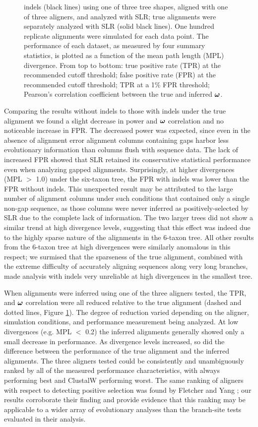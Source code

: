 \documentclass{article}
\begin{document}
\begin{figure}[t]
{  indels (black lines) using one of three tree shapes, aligned with
  one of three aligners, and analyzed with SLR; true alignments were
  separately analyzed with SLR (solid black lines). One hundred
  replicate alignments were simulated for each data point. The
  performance of each dataset, as measured by four summary statistics,
  is plotted as a function of the mean path length (MPL)
  divergence. From top to bottom: true positive rate (TPR) at the
  recommended cutoff threshold; false positive rate (FPR) at the
  recommended cutoff threshold; TPR at a 1\% FPR threshold; Pearson's
  correlation coefficient between the true and inferred $\bm{\omega}$.}
\label{fig_3}
\end{figure}

Comparing the results without indels to those with indels under the
true alignment we found a slight decrease in power and $\bm{\omega}$
correlation and no noticeable increase in FPR. The decreased power was
expected, since even in the absence of alignment error alignment
columns containing gaps harbor less evolutionary information than
columns flush with sequence data. The lack of increased FPR showed
that SLR retained its conservative statistical performance even when
analyzing gapped alignments. Surprisingly, at higher divergences (MPL
$>$ 1.0) under the six-taxon tree, the FPR with indels was lower than
the FPR without indels. This unexpected result may be attributed to
the large number of alignment columns under such conditions that
contained only a single non-gap sequence, as those columns were never
inferred as positively-selected by SLR due to the complete lack of
information. The two larger trees did not show a similar trend at high
divergence levels, suggesting that this effect was indeed due to the
highly sparse nature of the alignments in the 6-taxon tree. All other
results from the 6-taxon tree at high divergences were similarly
anomalous in this respect; we surmised that the sparseness of the true
alignment, combined with the extreme difficulty of accurately aligning
sequences along very long branches, made \sw analysis with indels very
unreliable at high divergences in the smallest tree.

When alignments were inferred using one of the three aligners tested,
the TPR, \tpr{} and $\bm{\omega}$ correlation were all reduced relative to
the true alignment (dashed and dotted lines, Figure \ref{fig_3}). The
degree of reduction varied depending on the aligner, simulation
conditions, and performance measurement being analyzed. At low
divergences (e.g. MPL $<$ 0.2) the inferred alignments generally
showed only a small decrease in performance. As divergence levels
increased, so did the difference between the performance of the true
alignment and the inferred alignments. The three aligners tested could
be consistently and unambiguously ranked by all of the measured
performance characteristics, with \prankc always performing best and
ClustalW performing worst. The same ranking of aligners with respect
to detecting positive selection was found by Fletcher and Yang
\citeyearpar{Fletcher2010Effect}; our results corroborate their
finding and provide evidence that this ranking may be applicable to a
wider array of evolutionary analyses than the branch-site tests
evaluated in their analysis.
\end{document}
